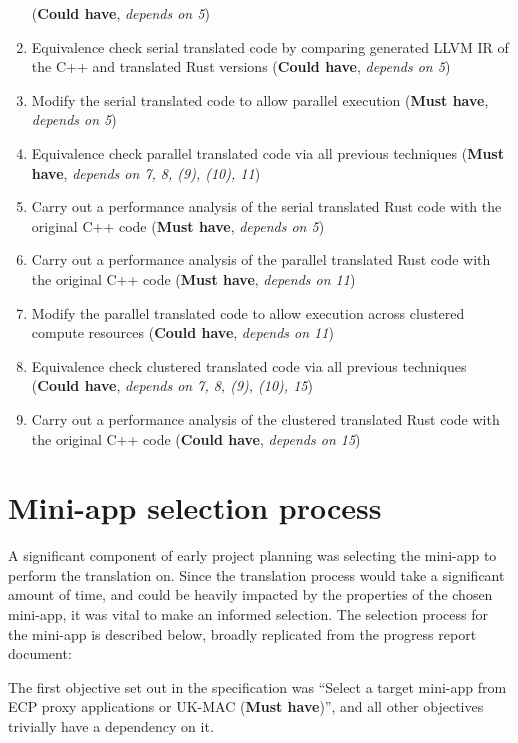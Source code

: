 \begin{enumerate}
  (\textbf{Could have}, \textit{depends on 5})
\item
  Equivalence check serial translated code by comparing generated LLVM IR of the C++ and translated Rust versions
  (\textbf{Could have}, \textit{depends on 5})
\item
  Modify the serial translated code to allow parallel execution
  (\textbf{Must have}, \textit{depends on 5})
\item
  Equivalence check parallel translated code via all previous techniques
  (\textbf{Must have}, \textit{depends on 7, 8, (9), (10), 11})
\item
  Carry out a performance analysis of the serial translated Rust code with the original C++ code
  (\textbf{Must have}, \textit{depends on 5})
\item
  Carry out a performance analysis of the parallel translated Rust code with the original C++ code
  (\textbf{Must have}, \textit{depends on 11})
\item
  Modify the parallel translated code to allow execution across clustered compute resources
  (\textbf{Could have}, \textit{depends on 11})
\item
  Equivalence check clustered translated code via all previous techniques
  (\textbf{Could have}, \textit{depends on 7, 8, (9), (10), 15})
\item
  Carry out a performance analysis of the clustered translated Rust code with the original C++ code
  (\textbf{Could have}, \textit{depends on 15})
\end{enumerate}



\section{Mini-app selection process}
\label{sec:miniapp-selection}

A significant component of early project planning was selecting the mini-app to perform the translation on. Since the translation process would take a significant amount of time, and could be heavily impacted by the properties of the chosen mini-app, it was vital to make an informed selection. The selection process for the mini-app is described below, broadly replicated from the progress report document:

The first objective set out in the specification was ``Select a target mini-app from ECP proxy applications or UK-MAC (\textbf{Must have})'', and all other objectives trivially have a dependency on it.

